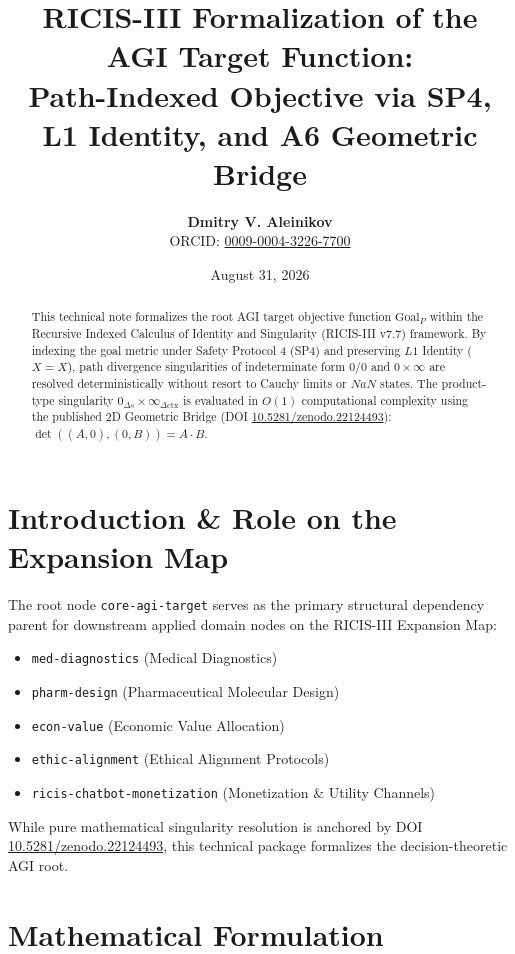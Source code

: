 \documentclass[11pt,a4paper]{article}
\title{\textbf{RICIS-III Formalization of the AGI Target Function:\\Path-Indexed Objective via SP4, L1 Identity, and A6 Geometric Bridge}}
\author{\textbf{Dmitry V. Aleinikov}\\ORCID: \href{https://orcid.org/0009-0004-3226-7700}{0009-0004-3226-7700}}
\date{August 31, 2026}
\begin{document}
\maketitle

\begin{abstract}
This technical note formalizes the root AGI target objective function $\mathrm{Goal}_P$ within the Recursive Indexed Calculus of Identity and Singularity (RICIS-III v7.7) framework. By indexing the goal metric under Safety Protocol 4 (SP4) and preserving $L1$ Identity ($X=X$), path divergence singularities of indeterminate form $0/0$ and $0 \times \infty$ are resolved deterministically without resort to Cauchy limits or $NaN$ states. The product-type singularity $0_{\Delta s} \times \infty_{\Delta\mathrm{ctx}}$ is evaluated in $O(1)$ computational complexity using the published 2D Geometric Bridge (DOI \href{https://doi.org/10.5281/zenodo.22124493}{10.5281/zenodo.22124493}): $\det((A,0),(0,B)) = A \cdot B$.
\end{abstract}

\section{Introduction \& Role on the Expansion Map}
The root node \texttt{core-agi-target} serves as the primary structural dependency parent for downstream applied domain nodes on the RICIS-III Expansion Map:
\begin{itemize}
    \item \texttt{med-diagnostics} (Medical Diagnostics)
    \item \texttt{pharm-design} (Pharmaceutical Molecular Design)
    \item \texttt{econ-value} (Economic Value Allocation)
    \item \texttt{ethic-alignment} (Ethical Alignment Protocols)
    \item \texttt{ricis-chatbot-monetization} (Monetization & Utility Channels)
\end{itemize}

While pure mathematical singularity resolution is anchored by DOI \href{https://doi.org/10.5281/zenodo.22124493}{10.5281/zenodo.22124493}, this technical package formalizes the decision-theoretic AGI root.

\section{Mathematical Formulation}
\end{document}
